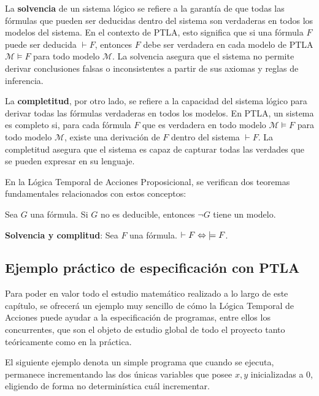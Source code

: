 La \textbf{solvencia} de un sistema lógico se refiere a la garantía de que todas las fórmulas que pueden ser deducidas dentro del sistema son verdaderas en todos los modelos del sistema. En el contexto de PTLA, esto significa que si una fórmula $F$ puede ser deducida $\vdash F $, entonces $F$ debe ser verdadera en cada modelo de PTLA $ \mathcal{M} \models F $ para todo modelo $\mathcal{M}$. La solvencia asegura que el sistema no permite derivar conclusiones falsas o inconsistentes a partir de sus axiomas y reglas de inferencia.

La \textbf{completitud}, por otro lado, se refiere a la capacidad del sistema lógico para derivar todas las fórmulas verdaderas en todos los modelos. En PTLA, un sistema es completo si, para cada fórmula $ F $ que es verdadera en todo modelo $ \mathcal{M} \models F $ para todo modelo $ \mathcal{M} $, existe una derivación de $ F $ dentro del sistema $ \vdash F $. La completitud asegura que el sistema es capaz de capturar todas las verdades que se pueden expresar en su lenguaje.

En la Lógica Temporal de Acciones Proposicional, se verifican dos teoremas fundamentales relacionados con estos conceptos:

\begin{teorema}
    Sea $G$ una fórmula. Si $G$ no es deducible, entonces $\neg G$ tiene un modelo.
\end{teorema}

\begin{teorema}
    \textbf{Solvencia y complitud}: Sea $F$ una fórmula. $\vdash F \Leftrightarrow \hspace{0.1cm} \models F$.
\end{teorema}

\subsection{Ejemplo práctico de especificación con PTLA}\label{subsection:PTLAExample}
Para poder en valor todo el estudio matemático realizado a lo largo de este capítulo, se ofrecerá un ejemplo muy sencillo de cómo la Lógica Temporal de Acciones puede ayudar a la especificación de programas, entre ellos los concurrentes, que son el objeto de estudio global de todo el proyecto tanto teóricamente como en la práctica.

El siguiente ejemplo denota un simple programa que cuando se ejecuta, permanece incrementando las dos únicas variables que posee $x,y$ inicializadas a 0, eligiendo de forma no determinística cuál incrementar.

